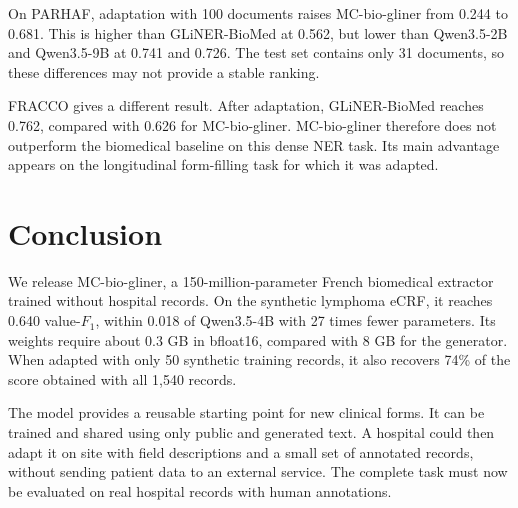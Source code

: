 On PARHAF, adaptation with 100 documents raises MC-bio-gliner from 0.244 to
0.681. This is higher than GLiNER-BioMed at 0.562, but lower than Qwen3.5-2B
and Qwen3.5-9B at 0.741 and 0.726. The test set contains only 31 documents, so
these differences may not provide a stable ranking.

FRACCO gives a different result. After adaptation, GLiNER-BioMed reaches 0.762,
compared with 0.626 for MC-bio-gliner. MC-bio-gliner therefore does not
outperform the biomedical baseline on this dense NER task. Its main advantage
appears on the longitudinal form-filling task for which it was adapted.

\FloatBarrier

\section*{Conclusion}

We release MC-bio-gliner, a 150-million-parameter French biomedical extractor
trained without hospital records. On the synthetic lymphoma eCRF, it reaches
0.640 value-$F_1$, within 0.018 of Qwen3.5-4B with 27 times fewer parameters.
Its weights require about 0.3 GB in bfloat16, compared with 8 GB for the
generator. When adapted with only 50 synthetic training records, it also
recovers 74\% of the score obtained with all 1,540 records.

The model provides a reusable starting point for new clinical forms. It can be
trained and shared using only public and generated text. A hospital could then
adapt it on site with field descriptions and a small set of annotated records,
without sending patient data to an external service. The complete task must now
be evaluated on real hospital records with human annotations.
